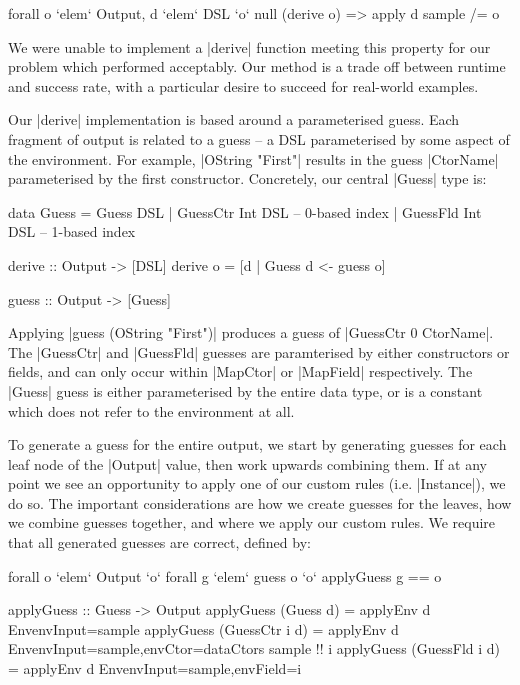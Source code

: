 \documentclass[preprint,draft]{sigplanconf}
\begin{document}
\ignore\begin{code}
forall o `elem` Output, d `elem` DSL `o` null (derive o) => apply d sample /= o
\end{code}

We were unable to implement a |derive| function meeting this property for our problem which performed acceptably. Our method is a trade off between runtime and success rate, with a particular desire to succeed for real-world examples.

Our |derive| implementation is based around a parameterised guess. Each fragment of output is related to a guess -- a DSL parameterised by some aspect of the environment. For example, |OString "First"| results in the guess |CtorName| parameterised by the first constructor. Concretely, our central |Guess| type is:

\begin{code}
data Guess  =  Guess DSL
            |  GuessCtr Int DSL -- 0-based index
            |  GuessFld Int DSL -- 1-based index

derive :: Output -> [DSL]
derive o = [d | Guess d <- guess o]

guess :: Output -> [Guess]
\end{code}

Applying |guess (OString "First")| produces a guess of |GuessCtr 0 CtorName|. The |GuessCtr| and |GuessFld| guesses are paramterised by either constructors or fields, and can only occur within |MapCtor| or |MapField| respectively. The |Guess| guess is either parameterised by the entire data type, or is a constant which does not refer to the environment at all.

To generate a guess for the entire output, we start by generating guesses for each leaf node of the |Output| value, then work upwards combining them. If at any point we see an opportunity to apply one of our custom rules (i.e. |Instance|), we do so. The important considerations are how we create guesses for the leaves, how we combine guesses together, and where we apply our custom rules. We require that all generated guesses are correct, defined by:

\ignore\begin{code}
forall o `elem` Output `o` forall g `elem` guess o `o` applyGuess g == o
\end{code}
\begin{code}
applyGuess :: Guess -> Output
applyGuess (Guess       d) = applyEnv d
    Env{envInput=sample}
applyGuess (GuessCtr i  d) = applyEnv d
    Env{envInput=sample,envCtor=dataCtors sample !! i}
applyGuess (GuessFld i  d) = applyEnv d
    Env{envInput=sample,envField=i}
\end{code}
\end{document}
